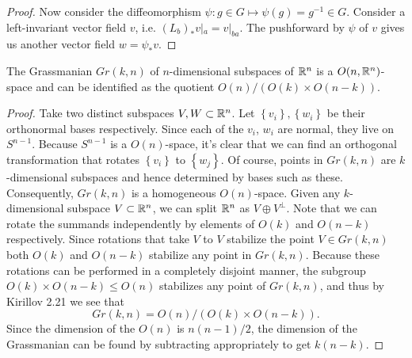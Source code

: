 \documentclass{../../mathnotes}
\begin{document}
\begin{proof}
    Now consider the diffeomorphism $\psi:g\in G\mapsto\psi(g)=g^{-1}\in G$. Consider a left-invariant vector field $v$, i.e. $(L_b)_*v|_a=v|_{ba}$. The pushforward
    by $\psi$ of $v$ gives us another vector field $w=\psi_* v$.
\end{proof}

\begin{prop}
    The Grassmanian $Gr(k,n)$ of $n$-dimensional subspaces of $\mathbb{R}^n$ is a $O(n,\mathbb{R}^n)$-space and can be identified as the quotient
    $O(n)/\left( O(k)\times O(n-k) \right)$.
\end{prop}
\begin{proof}
    Take two distinct subspaces $V,W\subset\mathbb{R}^n$. Let $\left\{ v_i \right\},\left\{ w_i \right\}$ be their orthonormal bases respectively.
    Since each of the $v_i$, $w_i$ are normal, they live on $S^{n-1}$. Because $S^{n-1}$ is a $O(n)$-space, it's clear that we can find
    an orthogonal transformation that rotates $\left\{ v_i \right\}$ to $\left\{ w_j \right\}$. Of course, points in $Gr(k,n)$
    are $k$-dimensional subspaces and hence determined by bases such as these. Consequently, $Gr(k,n)$ is a homogeneous $O(n)$-space.
    Given any $k$-dimensional subspace $V\subset\mathbb{R}^n$, we can split $\mathbb{R}^n$ as $V\oplus V^\perp$. Note that we can rotate the summands independently
    by elements of $O(k)$ and $O(n-k)$ respectively. Since rotations that take $V$ to $V$ stabilize the point $V\in Gr(k,n)$ both $O(k)$ and
    $O(n-k)$ stabilize any point in $Gr(k,n)$. Because these rotations can be performed in a completely disjoint manner, the subgroup
    $O(k)\times O(n-k)\leqslant O(n)$ stabilizes any point of $Gr(k,n)$, and thus by Kirillov 2.21 we see that
    \[Gr(k,n)=O(n)/\left( O(k)\times O(n-k) \right).\]
    Since the dimension of the $O(n)$ is $n(n-1)/2$, the dimension of the Grassmanian can be found by subtracting appropriately to get $k(n-k)$.
\end{proof}
\end{document}
